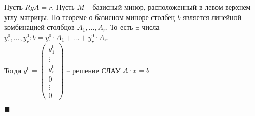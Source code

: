 \documentclass[a4paper,12pt]{article}
\begin{document}
    Пусть $RgA=r$. Пусть $M$ -- базисный минор, расположенный в левом верхнем углу матрицы. По теореме о базисном миноре столбец $b$ является линейной комбинацией столбцов $A_1, \ldots, A_r$. То есть $\exists$ числа $y_1^0, \ldots, y_r^0: b=y_1^0\cdot A_1+\ldots+y_r^0\cdot A_r$.\\ Тогда $y^0=\begin{pmatrix}
                                                                                                                                                                                                                                                                                                         y_1^0  \\
                                                                                                                                                                                                                                                                                                         \vdots \\
                                                                                                                                                                                                                                                                                                         y_r^0  \\
                                                                                                                                                                                                                                                                                                         0      \\
                                                                                                                                                                                                                                                                                                         \vdots \\
                                                                                                                                                                                                                                                                                                         0
    \end{pmatrix}$ -- решение СЛАУ $A\cdot x=b$
    \begin{flushright}
        $\blacksquare$
    \end{flushright}
\end{document}
